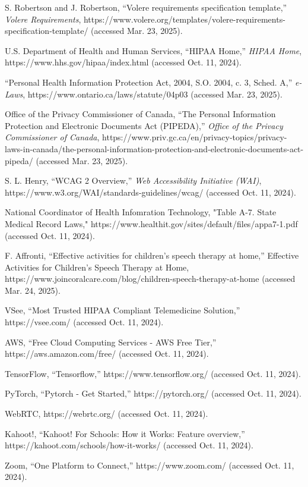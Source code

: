 \documentclass[12pt]{article}
\begin{document}
\begin{thebibliography}{9}

  S. Robertson and J. Robertson, “Volere requirements specification template,” \textit{Volere Requirements}, https://www.volere.org/templates/volere-requirements-specification-template/ (accessed Mar. 23, 2025). 

  U.S. Department of Health and Human Services, “HIPAA Home,” \textit{HIPAA Home}, https://www.hhs.gov/hipaa/index.html (accessed Oct. 11, 2024).

  “Personal Health Information Protection Act, 2004, S.O. 2004, c. 3, Sched. A,” \textit{e-Laws}, https://www.ontario.ca/laws/statute/04p03 (accessed Mar. 23, 2025). 

  Office of the Privacy Commissioner of Canada, “The Personal Information Protection and Electronic Documents Act (PIPEDA),” \textit{Office of the Privacy Commissioner of Canada}, https://www.priv.gc.ca/en/privacy-topics/privacy-laws-in-canada/the-personal-information-protection-and-electronic-documents-act-pipeda/ (accessed Mar. 23, 2025). 
  
  S. L. Henry, “WCAG 2 Overview,” \textit{Web Accessibility Initiative (WAI)}, https://www.w3.org/WAI/standards-guidelines/wcag/ (accessed Oct. 11, 2024).

  National Coordinator of Health Infomration Technology, "Table A-7. State Medical Record Laws," https://www.healthit.gov/sites/default/files/appa7-1.pdf (accessed Oct. 11, 2024). 
  
  F. Affronti, “Effective activities for children’s speech therapy at home,” Effective Activities for Children’s Speech Therapy at Home, https://www.joincoralcare.com/blog/children-speech-therapy-at-home (accessed Mar. 24, 2025). 

  VSee, “Most Trusted HIPAA Compliant Telemedicine Solution,” https://vsee.com/ (accessed Oct. 11, 2024).
  
  AWS, “Free Cloud Computing Services - AWS Free Tier,” https://aws.amazon.com/free/ (accessed Oct. 11, 2024).

  TensorFlow, “Tensorflow,” https://www.tensorflow.org/ (accessed Oct. 11, 2024).
  
  PyTorch, “Pytorch - Get Started,” https://pytorch.org/ (accessed Oct. 11, 2024).
  
  WebRTC, https://webrtc.org/ (accessed Oct. 11, 2024).
  
  Kahoot!, “Kahoot! For Schools: How it Works: Feature overview,” https://kahoot.com/schools/how-it-works/ (accessed Oct. 11, 2024).
  
  Zoom, “One Platform to Connect,” https://www.zoom.com/ (accessed Oct. 11, 2024).
  
  \end{thebibliography}
  
\end{document}
